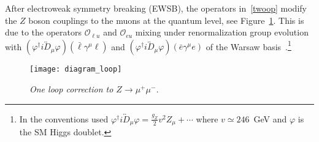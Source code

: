 \documentclass[aps,twocolumn,showpacs,preprintnumbers,amsmath,amssymb,floatfix,nofootinbib]{revtex4-1}
\begin{document}
After electroweak symmetry breaking (EWSB), the operators in~\eqref{twoop} modify the $Z$ boson couplings to the muons at the quantum level, see Figure~\ref{figZ}.   This is due to the operators $\mathcal{O}_{\ell u}$ and $\mathcal{O}_{eu}$ mixing under renormalization group evolution with $(\varphi^{\dag}  i  \overleftrightarrow D_{\mu} \varphi ) (\bar \ell \gamma^{\mu}  \ell)$ and $(\varphi^{\dag}  i  \overleftrightarrow D_{\mu} \varphi ) (\bar e \gamma^{\mu}  e)$ of the Warsaw basis~\cite{Jenkins:2013wua}.\footnote{In the conventions used $\varphi^{\dag}  i  \overleftrightarrow D_{\mu} \varphi = \frac{g_Z}{2} v^2  Z_{\mu} + \cdots$ where $v \simeq 246$~GeV and $\varphi$ is the SM Higgs doublet.}


\begin{figure}[htp]
   \vspace{-1.4cm}
\begin{center}{
\texttt{[image: diagram\_loop]}
  \vspace{-1.2cm}
\caption{\textit{One loop correction to $Z \to \mu^+ \mu^-$.}} \label{figZ}}
\end{center}
\end{figure}
%
\end{document}
